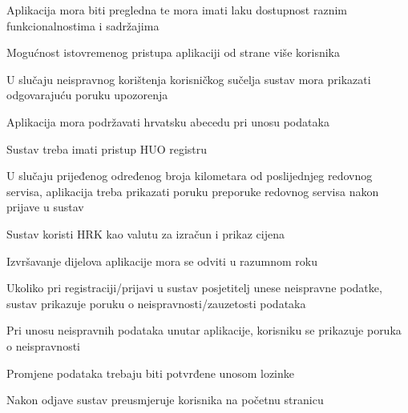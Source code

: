 			 	\begin{packed_item}
			 	
			 	\item  Aplikacija mora biti pregledna te mora imati laku dostupnost raznim funkcionalnostima i sadržajima
			 	\item Mogućnost istovremenog pristupa aplikaciji od strane više korisnika
			 	\item U slučaju neispravnog korištenja korisničkog sučelja sustav mora prikazati odgovarajuću poruku upozorenja
			 	\item  Aplikacija mora podržavati hrvatsku abecedu pri unosu podataka 
			 	\item Sustav treba imati pristup HUO registru
			 	\item  U slučaju prijeđenog određenog broja kilometara od poslijednjeg redovnog servisa, aplikacija treba prikazati poruku preporuke redovnog servisa nakon prijave u sustav
			 	\item Sustav koristi HRK kao valutu za izračun i prikaz cijena
			 	\item Izvršavanje dijelova aplikacije mora se odviti u razumnom roku
			 	\item Ukoliko pri registraciji/prijavi u sustav posjetitelj unese neispravne podatke, sustav prikazuje poruku o neispravnosti/zauzetosti podataka
			 	\item Pri unosu neispravnih podataka unutar aplikacije, korisniku se prikazuje poruka o neispravnosti
			 	\item Promjene podataka trebaju biti potvrđene unosom lozinke
			 	\item Nakon odjave sustav preusmjeruje korisnika na početnu stranicu
			 	
			 \end{packed_item}
			 
			 
			 
	